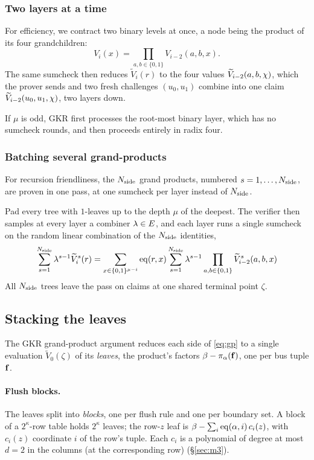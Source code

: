 \subsubsection{Two layers at a time}

For efficiency, we contract two binary levels at once, a node being the product of its four grandchildren:
\[
V_i(x)=\prod_{a,b\in\{0,1\}}V_{i-2}(a,b,x).
\]
The same sumcheck then reduces $\widetilde V_i(r)$ to the four values $\widetilde V_{i-2}(a,b,\chi)$, which the prover sends and two fresh challenges $(u_0,u_1)$ combine into one claim $\widetilde V_{i-2}(u_0,u_1,\chi)$, two layers down.

If $\mu$ is odd, GKR first processes the root-most binary layer, which has no sumcheck rounds, and then proceeds entirely in radix four.

\subsubsection{Batching several grand-products}

For recursion friendliness, the $N_{\mathrm{side}}$ grand products, numbered $s=1,\dots,N_{\mathrm{side}}$, are proven in one pass, at one sumcheck per layer instead of $N_{\mathrm{side}}$.

Pad every tree with $1$-leaves up to the depth $\mu$ of the deepest. The verifier then samples at every layer a combiner $\lambda \in E$, and each layer runs a single sumcheck on the random linear combination of the $N_{\mathrm{side}}$ identities,
\[
\sum_{s=1}^{N_{\mathrm{side}}}\lambda^{s-1}\widetilde V_i^{s}(r)=\sum_{x\in\{0,1\}^{\mu-i}}\operatorname{eq}(r,x)\sum_{s=1}^{N_{\mathrm{side}}}\lambda^{s-1}\prod_{a,b\in\{0,1\}}\widetilde V_{i-2}^{s}(a,b,x)
\]
All $N_{\mathrm{side}}$ trees leave the pass on claims at one shared terminal point $\zeta$.

\subsection{Stacking the leaves}\label{sec:leafstack}

The GKR grand-product argument reduces each side of \eqref{eq:gp} to a single evaluation $\widetilde V_0(\zeta)$ of its \emph{leaves}, the product's factors $\beta-\pi_\alpha(\mathbf{f})$, one per bus tuple $\mathbf{f}$.

\paragraph{Flush blocks.} The leaves split into \emph{blocks}, one per flush rule and one per boundary set. A block of a $2^{\kappa}$-row table holds $2^{\kappa}$ leaves; the row-$z$ leaf is $\beta-\sum_{i}\operatorname{eq}(\alpha,i)\,c_{i}(z)$, with $c_{i}(z)$ coordinate $i$ of the row's tuple. Each $c_i$ is a polynomial of degree at most $d = 2$ in the columns (at the corresponding row) (\S\ref{sec:m3}).

